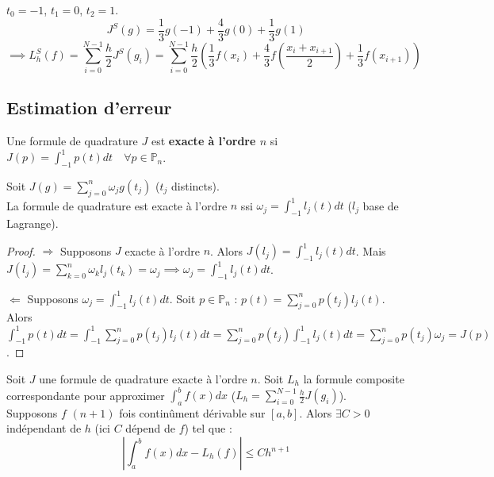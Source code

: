 \begin{exemple}
$t_0 = -1$, $t_1 = 0$, $t_2 = 1$.
$$J^S(g) = \frac{1}{3}g(-1) + \frac{4}{3}g(0) + \frac{1}{3}g(1)$$
$$\implies L_h^S(f) = \sum_{i=0}^{N-1} \frac{h}{2} J^S(g_i) = \sum_{i=0}^{N-1} \frac{h}{2} \left( \frac{1}{3}f(x_i) + \frac{4}{3}f\left(\frac{x_i+x_{i+1}}{2}\right) + \frac{1}{3}f(x_{i+1}) \right)$$
\end{exemple}

\subsection{Estimation d'erreur}

\begin{definition}[Exactitude]
Une formule de quadrature $J$ est \textbf{exacte à l'ordre $n$} si $J(p) = \int_{-1}^1 p(t)dt \quad \forall p \in \mathbb{P}_n$.
\end{definition}

\begin{proposition}
Soit $J(g) = \sum_{j=0}^n \omega_j g(t_j)$ ($t_j$ distincts). \\
La formule de quadrature est exacte à l'ordre $n$ ssi $\omega_j = \int_{-1}^1 l_j(t)dt$ ($l_j$ base de Lagrange).
\end{proposition}

\begin{proof}
$\Rightarrow$ Supposons $J$ exacte à l'ordre $n$. Alors $J(l_j) = \int_{-1}^1 l_j(t)dt$. 
Mais $J(l_j) = \sum_{k=0}^n \omega_k l_j(t_k) = \omega_j \implies \omega_j = \int_{-1}^1 l_j(t)dt$.

$\Leftarrow$ Supposons $\omega_j = \int_{-1}^1 l_j(t)dt$. Soit $p \in \mathbb{P}_n$ : $p(t) = \sum_{j=0}^n p(t_j)l_j(t)$.
Alors $\int_{-1}^1 p(t)dt = \int_{-1}^1 \sum_{j=0}^n p(t_j)l_j(t)dt = \sum_{j=0}^n p(t_j) \int_{-1}^1 l_j(t)dt = \sum_{j=0}^n p(t_j)\omega_j = J(p)$.
\end{proof}

\begin{proposition}
Soit $J$ une formule de quadrature exacte à l'ordre $n$. Soit $L_h$ la formule composite correspondante pour approximer $\int_a^b f(x)dx$ ($L_h = \sum_{i=0}^{N-1} \frac{h}{2} J(g_i)$). \\
Supposons $f$ $(n+1)$ fois continûment dérivable sur $[a, b]$.
Alors $\exists C > 0$ indépendant de $h$ (ici $C$ dépend de $f$) tel que :
$$\left| \int_a^b f(x)dx - L_h(f) \right| \le C h^{n+1}$$
\end{proposition}

